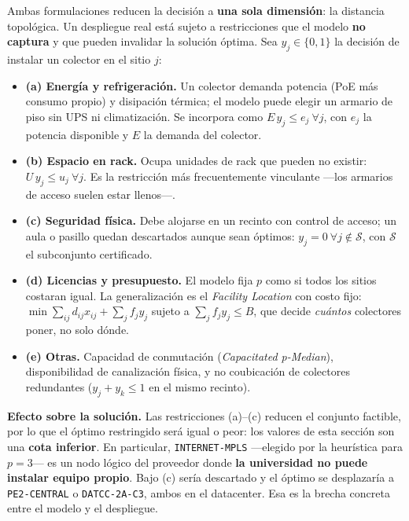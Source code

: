 \documentclass[11pt, a4paper]{article}
\begin{document}
Ambas formulaciones reducen la decisión a \textbf{una sola dimensión}: la
distancia topológica. Un despliegue real está sujeto a restricciones que el
modelo \textbf{no captura} y que pueden invalidar la solución óptima. Sea
$y_j\in\{0,1\}$ la decisión de instalar un colector en el sitio $j$:

\begin{itemize}\setlength{\itemsep}{2pt}
  \item \textbf{(a) Energía y refrigeración.} Un colector demanda potencia
        (PoE más consumo propio) y disipación térmica; el modelo puede
        elegir un armario de piso sin UPS ni climatización. Se incorpora
        como $E\,y_j \leq e_j\ \forall j$, con $e_j$ la potencia disponible
        y $E$ la demanda del colector.
  \item \textbf{(b) Espacio en rack.} Ocupa unidades de rack que pueden no
        existir: $U\,y_j \leq u_j\ \forall j$. Es la restricción más
        frecuentemente vinculante —los armarios de acceso suelen estar
        llenos—.
  \item \textbf{(c) Seguridad física.} Debe alojarse en un recinto con
        control de acceso; un aula o pasillo quedan descartados aunque sean
        óptimos: $y_j = 0\ \forall j \notin \mathcal{S}$, con $\mathcal{S}$
        el subconjunto certificado.
  \item \textbf{(d) Licencias y presupuesto.} El modelo fija $p$ como si
        todos los sitios costaran igual. La generalización es el
        \textit{Facility Location} con costo fijo:
        $\min \sum_{ij} d_{ij}x_{ij} + \sum_j f_j y_j$ sujeto a
        $\sum_j f_j y_j \leq B$, que decide \textit{cuántos} colectores
        poner, no solo dónde.
  \item \textbf{(e) Otras.} Capacidad de conmutación (\textit{Capacitated
        p-Median}), disponibilidad de canalización física, y no coubicación
        de colectores redundantes ($y_j + y_k \leq 1$ en el mismo recinto).
\end{itemize}

\textbf{Efecto sobre la solución.} Las restricciones (a)--(c) reducen el
conjunto factible, por lo que el óptimo restringido será igual o peor: los
valores de esta sección son una \textbf{cota inferior}. En particular,
\texttt{INTERNET-MPLS} —elegido por la heurística para $p=3$— es un nodo
lógico del proveedor donde \textbf{la universidad no puede instalar equipo
propio}. Bajo (c) sería descartado y el óptimo se desplazaría a
\texttt{PE2-CENTRAL} o \texttt{DATCC-2A-C3}, ambos en el datacenter. Esa es
la brecha concreta entre el modelo y el despliegue.
\end{document}
